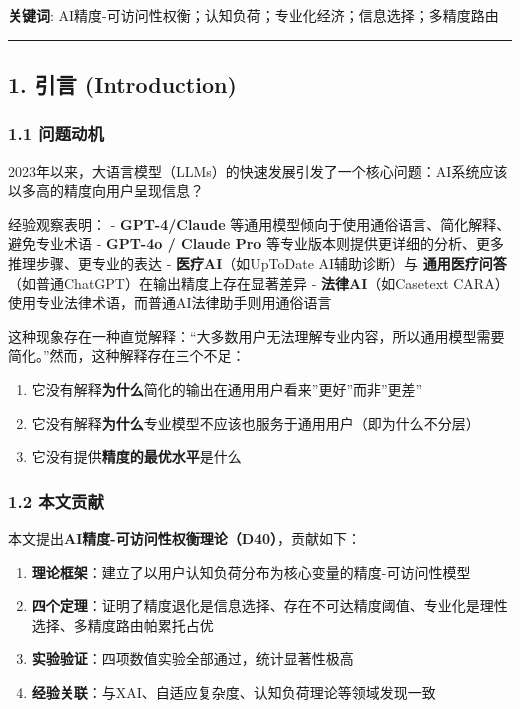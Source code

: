 \documentclass[UTF8, fontset=fandol]{ctexart}
\providecommand{\tightlist}{%
  \setlength{\itemsep}{0pt}\setlength{\parskip}{0pt}}
\begin{document}
\textbf{关键词}:
AI精度-可访问性权衡；认知负荷；专业化经济；信息选择；多精度路由

\begin{center}\rule{0.5\linewidth}{0.5pt}\end{center}

\subsection{1. 引言 (Introduction)}\label{ux5f15ux8a00-introduction}

\subsubsection{1.1 问题动机}\label{ux95eeux9898ux52a8ux673a}

2023年以来，大语言模型（LLMs）的快速发展引发了一个核心问题：AI系统应该以多高的精度向用户呈现信息？

经验观察表明： - \textbf{GPT-4/Claude}
等通用模型倾向于使用通俗语言、简化解释、避免专业术语 - \textbf{GPT-4o /
Claude Pro} 等专业版本则提供更详细的分析、更多推理步骤、更专业的表达 -
\textbf{医疗AI}（如UpToDate AI辅助诊断）与
\textbf{通用医疗问答}（如普通ChatGPT）在输出精度上存在显著差异 -
\textbf{法律AI}（如Casetext
CARA）使用专业法律术语，而普通AI法律助手则用通俗语言

这种现象存在一种直觉解释：``大多数用户无法理解专业内容，所以通用模型需要简化。''然而，这种解释存在三个不足：

\begin{enumerate}
\def\labelenumi{\arabic{enumi}.}
\tightlist
\item
  它没有解释\textbf{为什么}简化的输出在通用用户看来''更好''而非''更差''
\item
  它没有解释\textbf{为什么}专业模型不应该也服务于通用用户（即为什么不分层）
\item
  它没有提供\textbf{精度的最优水平}是什么
\end{enumerate}

\subsubsection{1.2 本文贡献}\label{ux672cux6587ux8d21ux732e}

本文提出\textbf{AI精度-可访问性权衡理论（D40）}，贡献如下：

\begin{enumerate}
\def\labelenumi{\arabic{enumi}.}
\tightlist
\item
  \textbf{理论框架}：建立了以用户认知负荷分布为核心变量的精度-可访问性模型
\item
  \textbf{四个定理}：证明了精度退化是信息选择、存在不可达精度阈值、专业化是理性选择、多精度路由帕累托占优
\item
  \textbf{实验验证}：四项数值实验全部通过，统计显著性极高
\item
  \textbf{经验关联}：与XAI、自适应复杂度、认知负荷理论等领域发现一致
\end{enumerate}
\end{document}
